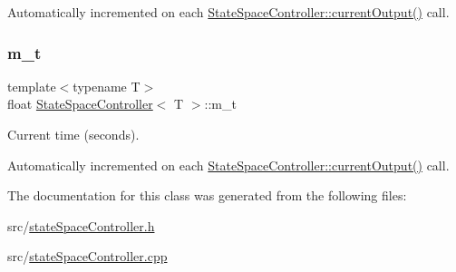Automatically incremented on each \hyperlink{classStateSpaceController_a007985a139e8946e1f61e5e402d81d2e}{State\+Space\+Controller\+::current\+Output()} call. \mbox{\label{classStateSpaceController_ab81980fe7a53ffa3d7269856b2729573}} 
\subsubsection{\texorpdfstring{m\+\_\+t}{m\_t}}
{\footnotesize\ttfamily template$<$typename T$>$ \\
float \hyperlink{classStateSpaceController}{State\+Space\+Controller}$<$ T $>$\+::m\+\_\+t\hspace{0.3cm}{\ttfamily [protected]}}



Current time (seconds). 

Automatically incremented on each \hyperlink{classStateSpaceController_a007985a139e8946e1f61e5e402d81d2e}{State\+Space\+Controller\+::current\+Output()} call. 

The documentation for this class was generated from the following files\+:\begin{DoxyCompactItemize}
\item 
src/\hyperlink{stateSpaceController_8h}{state\+Space\+Controller.\+h}\item 
src/\hyperlink{stateSpaceController_8cpp}{state\+Space\+Controller.\+cpp}\end{DoxyCompactItemize}
